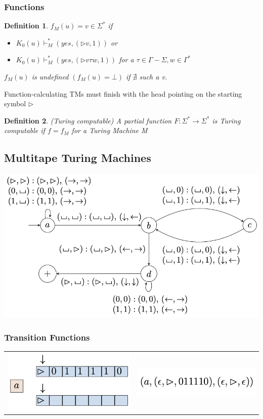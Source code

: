 \documentclass[a3paper, 8pt]{extarticle}
\newtheorem*{definition}{Definition}
\begin{document}
\begin{multicols*}{6}
\subsubsection{Functions}
\begin{definition}
    $f_M(u)=v \in \Sigma^*$ if \begin{itemize}
        \item $K_0(u) \vdash_M^* (yes,(\rhd v,1))$ or
        \item $K_0(u) \vdash_M^* (yes,(\rhd v \tau w,1))$  for a $\tau \in \Gamma - \Sigma, w \in \Gamma^*$
    \end{itemize}
    $f_M(u)$ is undefined $(f_M(u)= \bot)$ if $\nexists$  such a v.
\end{definition}
Function-calculating TMs must finish with the head pointing on the starting symbol $\rhd$

\begin{definition}
    (Turing computable) A partial function $F: \Sigma^* \to \Sigma^* 
    $ is Turing computable if $f=f_M$ for a Turing Machine M
\end{definition}

\subsection{Multitape Turing Machines}
\includegraphics[width=0.8 \columnwidth]{images/Screen Shot 2023-01-13 at 13.03.05.png}
\subsubsection{Transition Functions}
\begin{tabular}{c c}
    \includegraphics[width=0.4\columnwidth]{images/Screen Shot 2023-01-13 at 13.13.05.png} &  \includegraphics[width=0.4\columnwidth]{images/Screen Shot 2023-01-13 at 13.13.11.png}\\


\end{tabular}
\end{multicols*}
\end{document}
